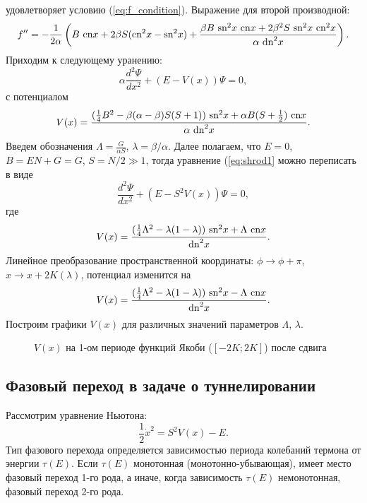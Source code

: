 \documentclass[12pt]{article}
\begin{document}
%
удовлетворяет условию (\ref{eq:f_condition}).
Выражение для второй производной:
%
$$f'' = -\frac{1}{2 \alpha} \left( B~\textrm{cn} x + 2\beta S (\textrm{cn}^2 x - \textrm{sn}^2 x) + \frac{\beta B~\textrm{sn}^2 x~\textrm{cn} x + 2 \beta^2 S~\textrm{sn}^2 x~\textrm{cn}^2 x}{\alpha~\textrm{dn}^2 x} \right).$$
%
Приходим к следующему уранению:
%
\begin{equation}
\alpha \frac{d^2 \Psi}{dx^2} + (E - V(x)) \Psi = 0,
\label{eq:shrod1}
\end{equation}
%
с потенциалом
%
\begin{equation}
V(x) = \frac{(\frac{1}{4}B^2 - \beta(\alpha - \beta) S (S+1))~\textrm{sn}^2 x + \alpha B (S + \frac{1}{2})~\textrm{cn} x}{\alpha~\textrm{dn}^2 x}.
\end{equation}
%
Введем обозначения $\Lambda = \frac{G}{\alpha S}$, $\lambda = \beta / \alpha$.
Далее полагаем, что $E = 0$, $B = EN + G = G$, $S = N/2 \gg 1$, тогда уравнение (\ref{eq:shrod1} можно переписать в виде
%
\begin{equation}
\frac{d^2 \Psi}{dx^2} + (E - S^2 V(x)) \Psi = 0,
\label{eq:shrod2}
\end{equation}
% 
где
%
\begin{equation}
V(x) = \frac{(\frac{1}{4} \Lambda^2 - \lambda (1 - \lambda))~\textrm{sn}^2 x + \Lambda~\textrm{cn} x}{\textrm{dn}^2 x}.
\end{equation}
%
Линейное преобразование пространственной координаты: $\phi \to \phi + \pi$, $x \to x + 2K(\lambda)$, потенциал изменится на
%
\begin{equation}
V(x) = \frac{(\frac{1}{4} \Lambda^2 - \lambda (1 - \lambda))~\textrm{sn}^2 x - \Lambda~\textrm{cn} x}{\textrm{dn}^2 x}.
\end{equation}
%
Построим графики $V(x)$ для различных значений параметров $\Lambda$, $\lambda$.
%
\begin{figure}[Ht!]
\caption{$V(x)$ на 1-ом периоде функций Якоби ($[-2K; 2K]$) после сдвига}
\end{figure}
%
%

\subsection*{Фазовый переход в задаче о туннелировании}

Рассмотрим уравнение Ньютона:
%
\begin{equation}
\frac{1}{2} \dot{x}^2 = S^2 V(x) - E.
\end{equation}
%
Тип фазового перехода определяется зависимостью периода колебаний термона от энергии $\tau(E)$.
Если $\tau(E)$ монотонная (монотонно-убывающая), имеет место фазовый переход 1-го рода, а иначе, когда зависимость $\tau(E)$ немонотонная, фазовый переход 2-го рода.
\end{document}
